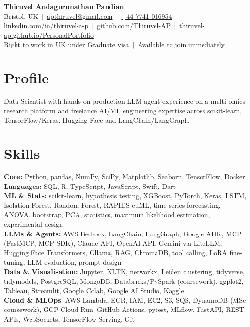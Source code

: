 \documentclass[a4paper,11pt]{article}
\begin{document}
\fontsize{11}{13.2}\selectfont

\begin{center}
  {\LARGE\bfseries Thiruvel Andagurunathan Pandian}\\[3pt]
  Bristol, UK \,$|$\, \href{mailto:apthiruvel@gmail.com}{apthiruvel@gmail.com} \,$|$\, \href{tel:+447741016954}{+44 7741 016954}\\[1pt]
\href{https://www.linkedin.com/in/thiruvel-a-p/}{linkedin.com/in/thiruvel-a-p} \,$|$\, \href{https://github.com/Thiruvel-AP}{github.com/Thiruvel-AP} \,$|$\, \href{https://thiruvel-ap.github.io/PersonalPortfolio/}{thiruvel-ap.github.io/PersonalPortfolio}\\[1pt]
  Right to work in UK under Graduate visa \,$|$\, Available to join immediately
\end{center}

\section{Profile}
Data Scientist with hands-on production LLM agent experience on a multi-omics research platform and freelance AI/ML engineering expertise across scikit-learn, TensorFlow/Keras, Hugging Face and LangChain/LangGraph.

\section{Skills}
\textbf{Core:} Python, pandas, NumPy, SciPy, Matplotlib, Seaborn, TensorFlow, Docker\\[2pt]
\textbf{Languages:} SQL, R, TypeScript, JavaScript, Swift, Dart\\[2pt]
\textbf{ML \& Stats:} scikit-learn, hypothesis testing, XGBoost, PyTorch, Keras, LSTM, Isolation Forest, Random Forest, RAPIDS cuML, time-series forecasting, ANOVA, bootstrap, PCA, statistics, maximum likelihood estimation, experimental design\\[2pt]
\textbf{LLMs \& Agents:} AWS Bedrock, LangChain, LangGraph, Google ADK, MCP (FastMCP, MCP SDK), Claude API, OpenAI API, Gemini via LiteLLM, Hugging Face Transformers, Ollama, RAG, ChromaDB, tool calling, LoRA fine-tuning, LLM evaluation, prompt design\\[2pt]
\textbf{Data \& Visualisation:} Jupyter, NLTK, networkx, Leiden clustering, tidyverse, tidymodels, PostgreSQL, MongoDB, Databricks/PySpark (coursework), ggplot2, Tableau, Streamlit, Google Colab, Google AI Studio, Kaggle\\[2pt]
\textbf{Cloud \& MLOps:} AWS Lambda, ECR, IAM, EC2, S3, SQS, DynamoDB (MSc coursework), GCP Cloud Run, GitHub Actions, pytest, MLflow, FastAPI, REST APIs, WebSockets, TensorFlow Serving, Git
\end{document}
